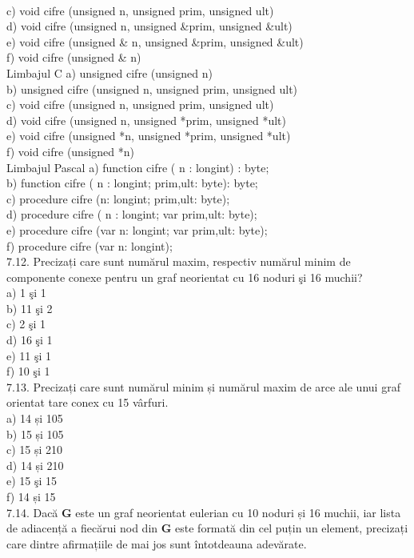 \\
c) void cifre (unsigned n, unsigned prim, unsigned ult)
\\
d) void cifre (unsigned n, unsigned \&prim, unsigned \&ult)
\\
e) void cifre (unsigned \& n, unsigned \&prim, unsigned \&ult)
\\
f) void cifre (unsigned \& n)
\\
Limbajul C
a) unsigned cifre (unsigned n)
\\
b) unsigned cifre (unsigned n, unsigned prim, unsigned ult)
\\
c) void cifre (unsigned n, unsigned prim, unsigned ult)
\\
d) void cifre (unsigned n, unsigned *prim, unsigned *ult)
\\
e) void cifre (unsigned *n, unsigned *prim, unsigned *ult)
\\
f) void cifre (unsigned *n)
\\
Limbajul Pascal
a) function cifre ( n : longint) : byte;
\\
b) function cifre ( n : longint; prim,ult: byte): byte;
\\
c) procedure cifre (n: longint; prim,ult: byte);
\\
d) procedure cifre ( n : longint; var prim,ult: byte);
\\
e) procedure cifre (var n: longint; var prim,ult: byte);
\\
f) procedure cifre (var n: longint);
\\
7.12. Precizați care sunt numărul maxim, respectiv numărul minim de componente conexe pentru un graf neorientat cu 16 noduri şi 16 muchii?
\\
a) 1 şi 1
\\
b) 11 şi 2
\\
c) 2 şi 1
\\
d) 16 şi 1
\\
e) 11 şi 1
\\
f) 10 şi 1
\\
7.13. Precizați care sunt numărul minim și numărul maxim de arce ale unui graf orientat tare conex cu 15 vârfuri.
\\
a) 14 și 105 
\\
b) 15 și 105
\\
c) 15 și 210
\\
d) 14 și 210
\\
e) 15 şi 15
\\
f) 14 și 15
\\
7.14. Dacă $\mathbf{G}$ este un graf neorientat eulerian cu 10 noduri și 16 muchii, iar lista de adiacență a fiecărui nod din $\mathbf{G}$ este formată din cel puțin un element, precizați care dintre afirmațiile de mai jos sunt întotdeauna adevărate.
